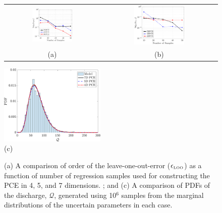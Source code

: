 \begin{figure}[htbp]
 \begin{center}
 \begin{tabular}{cc}
  \includegraphics[width=0.45\textwidth]{./Figures/err_samples_borehole}
  &
  \includegraphics[width=0.45\textwidth]{./Figures/errL2_samples_borehole}
  \\ (a) & (b)
  \end{tabular}
  \includegraphics[width=0.45\textwidth]{./Figures/pdf_comp_borehole}
  \\ (c)
\caption{(a) A comparison of order of the leave-one-out-error 
($\epsilon_{\mbox{\tiny{LOO}}}$) as a function of number of regression samples
used for constructing the PCE in 4, 5, and 7 dimensions. ;
and (c) A comparison of
PDFs of the discharge, $\mathcal{Q}$, generated using 10$^{6}$ samples from
the marginal distributions of the uncertain parameters in each case.} 
\label{fig:conv_bore}
\end{center}
\end{figure}

